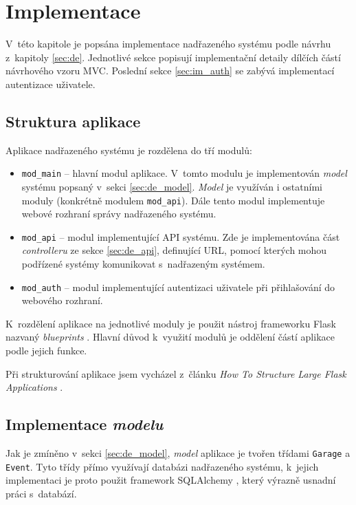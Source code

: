 \chapter{Implementace}
\label{sec:im}

V~této kapitole je popsána implementace nadřazeného systému podle návrhu z~kapitoly \ref{sec:de}. Jednotlivé sekce popisují implementační detaily dílčích částí návrhového vzoru MVC. Poslední sekce \ref{sec:im_auth} se zabývá implementací autentizace uživatele.

\section{Struktura aplikace}

Aplikace nadřazeného systému je rozdělena do tří modulů:

\begin{itemize}
    \item \texttt{mod\_main} -- hlavní modul aplikace. V~tomto modulu je implementován \textit{model} systému popsaný v~sekci \ref{sec:de_model}. \textit{Model} je využíván i ostatními moduly (konkrétně modulem \texttt{mod\_api}). Dále tento modul implementuje webové rozhraní správy nadřazeného systému.
    \item \texttt{mod\_api} -- modul implementující API systému. Zde je implementována část \textit{controlleru} ze sekce \ref{sec:de_api}, definující URL, pomocí kterých mohou podřízené systémy komunikovat s~nadřazeným systémem.
    \item \texttt{mod\_auth} -- modul implementující autentizaci uživatele při přihlašování do webového rozhraní.
\end{itemize}

K~rozdělení aplikace na jednotlivé moduly je použit nástroj frameworku Flask nazvaný \textit{blueprints} \cite{flask_blueprints}.  Hlavní důvod k~využití modulů je oddělení částí aplikace podle jejich funkce.

Při strukturování aplikace jsem vycházel z~článku \textit{How To Structure Large Flask Applications} \cite{flask_large}.

\section{Implementace \textit{modelu}}

Jak je zmíněno v~sekci \ref{sec:de_model}, \textit{model} aplikace je tvořen třídami \texttt{Garage} a \texttt{Event}. Tyto třídy přímo využívají databázi nadřazeného systému, k~jejich implementaci je proto použit framework SQLAlchemy \cite{sqlalchemy}, který výrazně usnadní práci s~databází.

